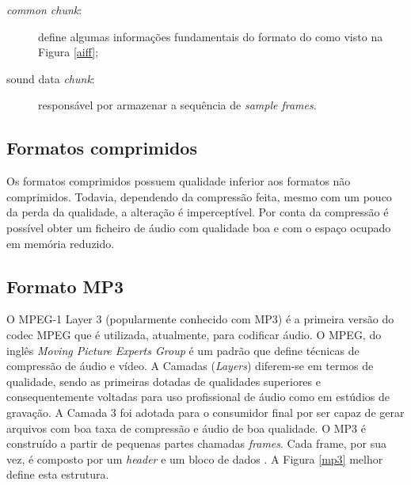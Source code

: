 \begin{description}
	\item [\textit{common chunk}:] define algumas informações fundamentais do formato do como visto na Figura \ref{aiff};
	\item [sound data \textit{chunk}:] responsável por armazenar a sequência de \textit{sample frames}.
\end{description}

\subsection{Formatos comprimidos}

Os formatos comprimidos possuem qualidade inferior aos formatos não comprimidos. Todavia, dependendo da compressão feita, mesmo com um pouco da perda da qualidade, a alteração é imperceptível. Por conta da compressão é possível obter um ficheiro de áudio com qualidade boa e com o espaço ocupado em memória reduzido.

\subsection{Formato MP3}

O MPEG-1 Layer 3 (popularmente conhecido com MP3) é a primeira versão do codec MPEG que é utilizada, atualmente, para codificar áudio. O MPEG, do inglês \textit{Moving Picture Experts Group} é um padrão que define técnicas de compressão de áudio e vídeo. A Camadas (\textit{Layers}) diferem-se em termos de qualidade, sendo as primeiras dotadas de qualidades superiores e consequentemente voltadas para uso profissional de áudio como em estúdios de gravação. A Camada 3 foi adotada para o consumidor final por ser capaz de gerar arquivos com boa taxa de compressão e áudio de boa qualidade. O MP3 é construído a partir de pequenas partes chamadas \textit{frames}. Cada frame, por sua vez, é composto por um \textit{header} e um bloco de dados \cite{mpgedit}. A Figura \ref{mp3} melhor define esta estrutura.


